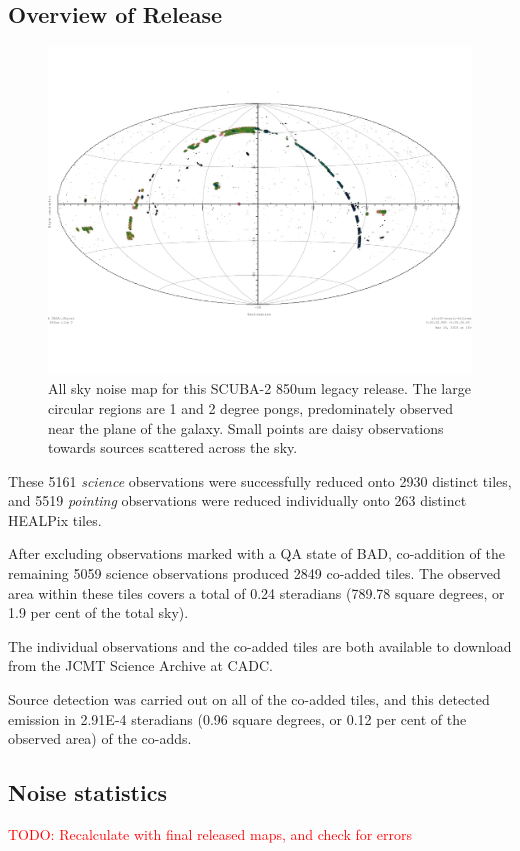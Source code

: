 \documentclass[usenatbib]{mnras}
\newcommand{\todo}[1]{\textcolor{red}{TODO: #1}}
\newcommand{\status}[1]{\textsf{#1}}
\begin{document}
\subsection{Overview of Release}

\begin{figure}
  \centering
  \includegraphics[width=0.9\linewidth]{legacy850-noise-aitoff}
  \caption{All sky noise map for this SCUBA-2 850um legacy
    release. The large circular regions are 1 and 2 degree pongs,
    predominately observed near the plane of the galaxy. Small points
    are daisy observations towards sources scattered across the
    sky.}
  \label{fig:noise-aitoff}
\end{figure}

These 5161 \emph{science} observations were successfully reduced onto
2930 distinct tiles, and 5519 \emph{pointing} observations were
reduced individually onto 263 distinct HEALPix tiles.

After excluding observations marked with a QA state of \status{BAD},
co-addition of the remaining 5059 science observations produced 2849
co-added tiles. The observed area within these tiles covers a total of
0.24 steradians (789.78 square degrees, or 1.9 per cent of the total
sky).

The individual observations and the co-added tiles are both available
to download from the JCMT Science Archive at CADC.

Source detection was carried out on all of the co-added tiles, and this
detected emission in 2.91E-4 steradians (0.96 square degrees, or 0.12
per cent of the observed area) of the co-adds.

\subsection{Noise statistics}
\todo{Recalculate with final released maps, and check for errors}
\end{document}
